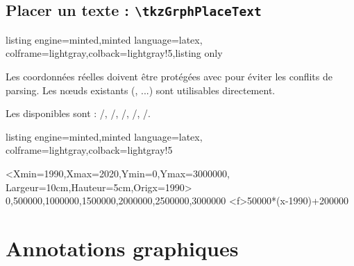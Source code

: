 \documentclass[11pt,a4paper]{ltxdoc}
\begin{document}
\subsection{Placer un texte : \texttt{\textbackslash tkzGrphPlaceText}}

\begin{tcblisting}{listing engine=minted,minted language=latex,
  colframe=lightgray,colback=lightgray!5,listing only}
\end{tcblisting}

Les coordonnées réelles doivent être protégées avec  pour éviter les conflits de parsing. Les nœuds existants (, ...) sont utilisables directement.

\smallskip

Les \MontreCode{[clés]} disponibles sont : /, /, /, /, /.

\begin{tcblisting}{listing engine=minted,minted language=latex,
  colframe=lightgray,colback=lightgray!5}
\begin{tkzGrph}<Xmin=1990,Xmax=2020,Ymin=0,Ymax=3000000,
               Largeur=10cm,Hauteur=5cm,Origx=1990>
    {0,500000,1000000,1500000,2000000,2500000,3000000}
  \tkzGrphDefineCurve[trace,name=cf,color=blue]<f>{50000*(x-1990)+200000}
\end{tkzGrph}
\end{tcblisting}

\pagebreak

\section{Annotations graphiques}
\end{document}
